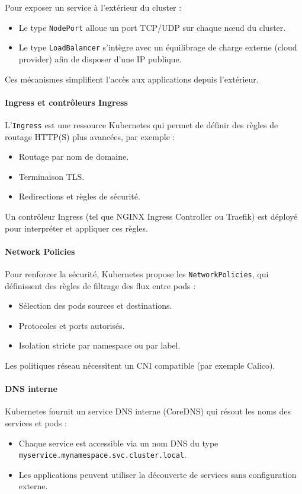 Pour exposer un service à l’extérieur du cluster :
\begin{itemize}
	\item Le type \texttt{NodePort} alloue un port TCP/UDP sur chaque nœud du cluster.
	\item Le type \texttt{LoadBalancer} s’intègre avec un équilibrage de charge externe (cloud provider) afin de disposer d’une IP publique.
\end{itemize}
Ces mécanismes simplifient l’accès aux applications depuis l’extérieur.

\paragraph{Ingress et contrôleurs Ingress}

L’\texttt{Ingress} est une ressource Kubernetes qui permet de définir des règles de routage HTTP(S) plus avancées, par exemple :
\begin{itemize}
	\item Routage par nom de domaine.
	\item Terminaison TLS.
	\item Redirections et règles de sécurité.
\end{itemize}
Un contrôleur Ingress (tel que NGINX Ingress Controller ou Traefik) est déployé pour interpréter et appliquer ces règles.

\paragraph{Network Policies}

Pour renforcer la sécurité, Kubernetes propose les \texttt{NetworkPolicies}, qui définissent des règles de filtrage des flux entre pods :
\begin{itemize}
	\item Sélection des pods sources et destinations.
	\item Protocoles et ports autorisés.
	\item Isolation stricte par namespace ou par label.
\end{itemize}
Les politiques réseau nécessitent un CNI compatible (par exemple Calico).

\paragraph{DNS interne}

Kubernetes fournit un service DNS interne (CoreDNS) qui résout les noms des services et pods :
\begin{itemize}
	\item Chaque service est accessible via un nom DNS du type \texttt{myservice.mynamespace.svc.cluster.local}.
	\item Les applications peuvent utiliser la découverte de services sans configuration externe.
\end{itemize}

